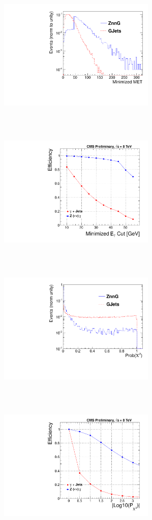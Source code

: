 \begin{figure}[!h]
 \centering
  {\label{fig:distaa}\includegraphics[width=7.5cm,height=7cm]{analysis_figs/minMET.pdf}}
  {\label{fig:distbb}\includegraphics[width=7.5cm,height=7cm]{analysis_figs/roc_minMET.pdf}} \\
  {\label{fig:distcc}\includegraphics[width=7.5cm,height=7cm]{analysis_figs/pvalue.pdf}} 
  {\label{fig:distdd}\includegraphics[width=7.5cm,height=7cm]{analysis_figs/roc_pvalue.pdf}}

\end{figure}
